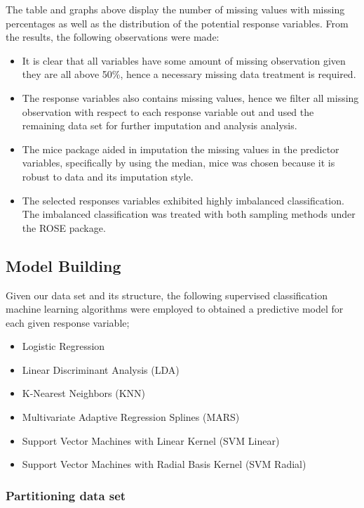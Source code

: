 \documentclass[
  10pt,
]{article}
\begin{document}
The table and graphs above display the number of missing values with missing percentages as well as the distribution of the potential response variables. From the results, the following observations were made:

\begin{itemize}
\item
  It is clear that all variables have some amount of missing observation given they are all above 50\%, hence a necessary missing data treatment is required.
\item
  The response variables also contains missing values, hence we filter all missing observation with respect to each response variable out and used the remaining data set for further imputation and analysis analysis.
\item
  The mice package aided in imputation the missing values in the predictor variables, specifically by using the median, mice was chosen because it is robust to data and its imputation style.
\item
  The selected responses variables exhibited highly imbalanced classification. The imbalanced classification was treated with both sampling methods under the ROSE package.
\end{itemize}

\hypertarget{model-building}{%
\subsection{Model Building}\label{model-building}}

Given our data set and its structure, the following supervised classification machine learning algorithms were employed to obtained a predictive model for each given response variable;

\begin{itemize}
\item
  Logistic Regression
\item
  Linear Discriminant Analysis (LDA)
\item
  K-Nearest Neighbors (KNN)
\item
  Multivariate Adaptive Regression Splines (MARS)
\item
  Support Vector Machines with Linear Kernel (SVM Linear)
\item
  Support Vector Machines with Radial Basis Kernel (SVM Radial)
\end{itemize}

\hypertarget{partitioning-data-set}{%
\subsubsection{Partitioning data set}\label{partitioning-data-set}}
\end{document}
